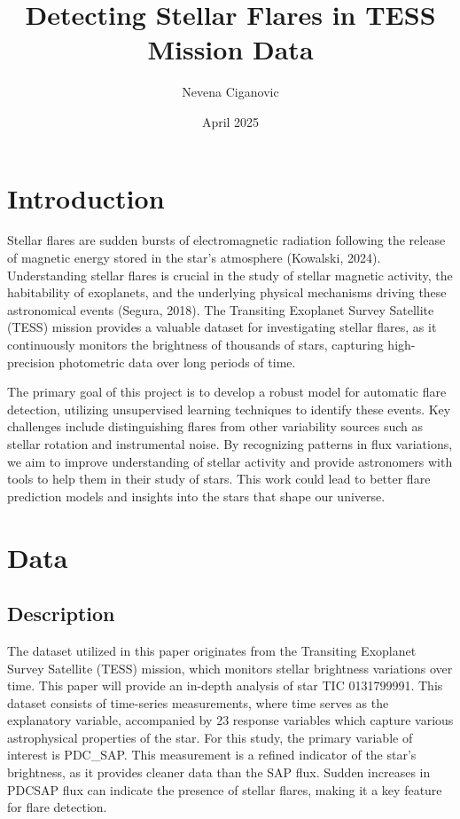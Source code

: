 \documentclass{article}
\title{Detecting Stellar Flares in TESS Mission Data}
\author{Nevena Ciganovic}
\date{April 2025}
\begin{document}
\maketitle

\section{Introduction}

Stellar flares are sudden bursts of electromagnetic radiation following the release of magnetic energy stored in the star's atmosphere (Kowalski, 2024). Understanding stellar flares is crucial in the study of stellar magnetic activity, the habitability of exoplanets, and the underlying physical mechanisms driving these astronomical events (Segura, 2018). The Transiting Exoplanet Survey Satellite (TESS) mission provides a valuable dataset for investigating stellar flares, as it continuously monitors the brightness of thousands of stars, capturing high-precision photometric data over long periods of time.

The primary goal of this project is to develop a robust model for automatic flare detection, utilizing unsupervised learning techniques to identify these events. Key challenges include distinguishing flares from other variability sources such as stellar rotation and instrumental noise. By recognizing patterns in flux variations, we aim to improve understanding of stellar activity and provide astronomers with tools to help them in their study of stars. This work could lead to better flare prediction models and insights into the stars that shape our universe.

\section{Data}

\subsection{Description}
The dataset utilized in this paper originates from the Transiting Exoplanet Survey Satellite (TESS) mission, which monitors stellar brightness variations over time. This paper will provide an in-depth analysis of star TIC 0131799991. This dataset consists of time-series measurements, where time serves as the explanatory variable, accompanied by 23 response variables which capture various astrophysical properties of the star. For this study, the primary variable of interest is PDC\_SAP. This measurement is a refined indicator of the star’s brightness, as it provides cleaner data than the SAP flux. Sudden increases in PDCSAP flux can indicate the presence of stellar flares, making it a key feature for flare detection.
\end{document}
